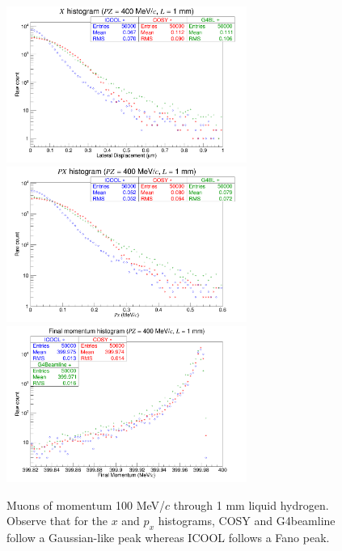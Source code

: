 \begin{figure}[H]
  \centering
    \includegraphics[width=0.7\textwidth]{Benchmarking/LH/X.400.1.png} 
    \includegraphics[width=0.7\textwidth]{Benchmarking/LH/PX.400.1.png} 
    \includegraphics[width=0.7\textwidth]{Benchmarking/LH/strag.400.1.png} 
  \caption[Muons of momentum 400 MeV/$c$ through 1 mm liquid hydrogen.]{Muons of momentum 100 MeV/$c$ through 1 mm liquid hydrogen. Observe that for the $x$ and $p_x$ histograms, COSY and G4beamline follow a Gaussian-like peak whereas ICOOL follows a Fano peak.}
  \label{fig:400.1}
\end{figure}

